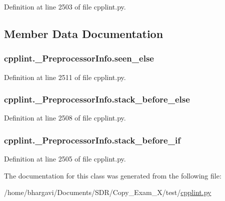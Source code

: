 Definition at line 2503 of file cpplint.\+py.



\subsection{Member Data Documentation}
\subsubsection[{\texorpdfstring{seen\+\_\+else}{seen_else}}]{\setlength{\rightskip}{0pt plus 5cm}cpplint.\+\_\+\+Preprocessor\+Info.\+seen\+\_\+else}\hypertarget{classcpplint_1_1___preprocessor_info_a7587e84a1e6db34c3c94317f5a5931cc}{}\label{classcpplint_1_1___preprocessor_info_a7587e84a1e6db34c3c94317f5a5931cc}


Definition at line 2511 of file cpplint.\+py.

\subsubsection[{\texorpdfstring{stack\+\_\+before\+\_\+else}{stack_before_else}}]{\setlength{\rightskip}{0pt plus 5cm}cpplint.\+\_\+\+Preprocessor\+Info.\+stack\+\_\+before\+\_\+else}\hypertarget{classcpplint_1_1___preprocessor_info_a34a80f1f97808614b7062ba1e5bbf2b9}{}\label{classcpplint_1_1___preprocessor_info_a34a80f1f97808614b7062ba1e5bbf2b9}


Definition at line 2508 of file cpplint.\+py.

\subsubsection[{\texorpdfstring{stack\+\_\+before\+\_\+if}{stack_before_if}}]{\setlength{\rightskip}{0pt plus 5cm}cpplint.\+\_\+\+Preprocessor\+Info.\+stack\+\_\+before\+\_\+if}\hypertarget{classcpplint_1_1___preprocessor_info_a0681b2adca3171a495fc1eca43d245c0}{}\label{classcpplint_1_1___preprocessor_info_a0681b2adca3171a495fc1eca43d245c0}


Definition at line 2505 of file cpplint.\+py.



The documentation for this class was generated from the following file\+:\begin{DoxyCompactItemize}
\item 
/home/bhargavi/\+Documents/\+S\+D\+R/\+Copy\+\_\+\+Exam\+\_\+X/test/\hyperlink{cpplint_8py}{cpplint.\+py}\end{DoxyCompactItemize}
